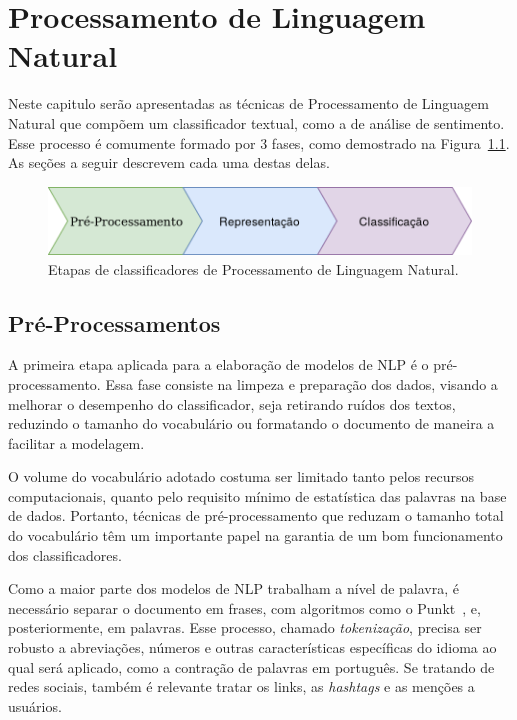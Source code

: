 \chapter{Processamento de Linguagem Natural}
\label{chapter:nlp}

Neste capitulo serão apresentadas as técnicas de Processamento de Linguagem
Natural que compõem um classificador textual, como a de análise de sentimento.
Esse processo é comumente formado por 3 fases, como demostrado na
Figura~\ref{fig:nlp_diagram}.
As seções a seguir descrevem cada uma destas delas.

\begin{figure}[h]
\begin{center} {
    \begin{center}
    \includegraphics[scale=0.35]{images/nlp_diagram.png}
    \caption{Etapas de classificadores de Processamento de Linguagem Natural.}
    \label{fig:nlp_diagram}
    \end{center}
}
\end{center}
\end{figure}

\section{Pré-Processamentos}

A primeira etapa aplicada para a elaboração de modelos de NLP é o
pré-processamento.
Essa fase consiste na limpeza e preparação dos dados, visando a melhorar o
desempenho do classificador, seja retirando ruídos dos textos, reduzindo o
tamanho do vocabulário ou formatando o documento de maneira a facilitar a modelagem.

O volume do vocabulário adotado costuma ser limitado tanto pelos recursos
computacionais, quanto pelo requisito mínimo de estatística das palavras na base
de dados.
Portanto, técnicas de pré-processamento que reduzam o tamanho total do
vocabulário têm um importante papel na garantia de um bom funcionamento dos
classificadores.

Como a maior parte dos modelos de NLP trabalham a nível de palavra, é necessário
separar o documento em frases, com algoritmos como o Punkt~\cite{kiss06}, e,
posteriormente, em palavras.
Esse processo, chamado \textit{tokenização}, precisa ser robusto a abreviações,
números e outras características específicas do idioma ao qual será aplicado,
como a contração de palavras em português.
Se tratando de redes sociais, também é relevante tratar os links, as
\textit{hashtags} e as menções a usuários.

